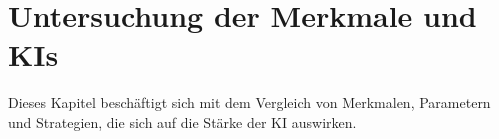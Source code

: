 
\chapter{Untersuchung der Merkmale und \acp{KI}}
\label{chap:merkmale}

Dieses Kapitel beschäftigt sich mit dem Vergleich von Merkmalen, Parametern und Strategien, die sich auf die Stärke der \ac{KI} auswirken.




